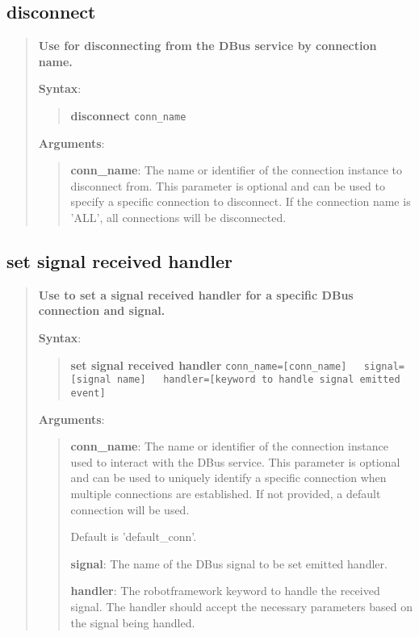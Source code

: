 \hypertarget{description-disconnect}{%
\subsection{\texorpdfstring{\textbf{disconnect}}{disconnect}}\label{description-disconnect}}

\begin{quote}
\textbf{Use for disconnecting from the DBus service by connection name.}

\textbf{Syntax}:

\begin{quote}
\textbf{disconnect} \texttt{conn\_name}
\end{quote}

\textbf{Arguments}:

\begin{quote}
\textbf{conn\_name}: The name or identifier of the connection instance to disconnect from.
This parameter is optional and can be used to specify a specific connection
to disconnect. If the connection name is 'ALL', all connections will be disconnected.
\end{quote}
\end{quote}

\hypertarget{description-set-signal-received-handler}{%
\subsection{\texorpdfstring{\textbf{set signal received handler}}{set signal received handler}}\label{description-set-signal-received-handler}}

\begin{quote}
\textbf{Use to set a signal received handler for a specific DBus connection and signal.}

\textbf{Syntax}:

\begin{quote}
\textbf{set signal received handler}
\texttt{conn\_name={[}conn\_name{]}\ \ \ signal={[}signal name{]}\ \ \ handler={[}keyword to handle signal emitted event{]}}
\end{quote}

\textbf{Arguments}:

\begin{quote}
\textbf{conn\_name}: The name or identifier of the connection instance used to interact with the DBus service.
  This parameter is optional and can be used to uniquely identify a specific connection
  when multiple connections are established. If not provided, a default connection will be used.
  
  Default is 'default\_conn'.
  
\vspace{\baselineskip}

\textbf{signal}: The name of the DBus signal to be set emitted handler.

\vspace{\baselineskip}

\textbf{handler}:  The robotframework keyword to handle the received signal.
  The handler should accept the necessary parameters based on the signal being handled.
\end{quote}
\end{quote}

